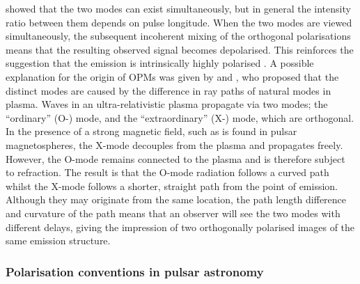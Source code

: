 \citet{MSxx2000} showed that the two modes can exist simultaneously, but in general the intensity ratio between them depends on pulse longitude. When the two modes are viewed simultaneously, the subsequent incoherent mixing of the orthogonal polarisations means that the resulting observed signal becomes depolarised. This reinforces the suggestion that the emission is intrinsically highly polarised . A possible explanation for the origin of OPMs was given by \citet{Mxxx1979} and \citet{ABxx1986}, who proposed that the distinct modes are caused by the difference in ray paths of natural modes in plasma. Waves in an ultra-relativistic plasma propagate via two modes; the ``ordinary'' (O-) mode, and the ``extraordinary'' (X-) mode, which are orthogonal. In the presence of a strong magnetic field, such as is found in pulsar magnetospheres, the X-mode decouples from the plasma and propagates freely. However, the O-mode remains connected to the plasma and is therefore subject to refraction. The result is that the O-mode radiation follows a curved path whilst the X-mode follows a shorter, straight path from the point of emission. Although they may originate from the same location, the path length difference and curvature of the path means that an observer will see the two modes with different delays, giving the impression of two orthogonally polarised images of the same emission structure.

\subsubsection*{Polarisation conventions in pulsar astronomy}
\label{sec: intro - emission models - polarisation - conventions}

